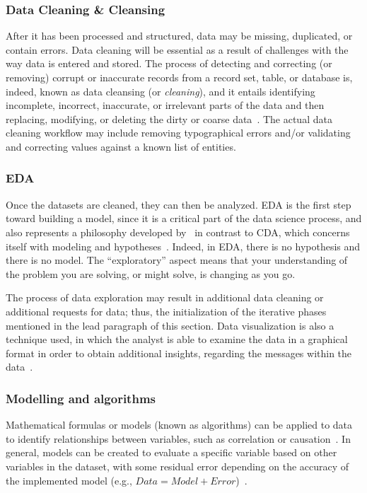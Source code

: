 \subsubsection{Data Cleaning \& Cleansing}
After it has been processed and structured, data may be missing, duplicated, or contain errors. Data cleaning will be essential as a result of challenges with the way data is entered and stored.
The process of detecting and correcting (or removing) corrupt or inaccurate records from a record set, table, or database is, indeed, known as data cleansing (or \textit{cleaning}),
and it entails identifying incomplete, incorrect, inaccurate, or irrelevant parts of the data and then replacing, modifying, or deleting the dirty or coarse data~\cite{Misc:2019_data_cleaning_wiki}.
The actual data cleaning workflow may include removing typographical errors and/or validating and correcting values against a known list of entities.

\subsubsection{\acl{EDA}}
Once the datasets are cleaned, they can then be analyzed.
\ac{EDA} is the first step toward building a model, since it is a critical part of the data science process, and also represents a philosophy developed by~\citeauthor{Article:future_of_data_tukey}
in contrast to \ac{CDA}, which concerns itself with modeling and hypotheses~\cite{Article:future_of_data_tukey}.
Indeed, in \ac{EDA}, there is no hypothesis and there is no model. The ``exploratory'' aspect means that your understanding of the problem you are solving, or might solve, is changing as you go.

The process of data exploration may result in additional data cleaning or additional requests for data; thus, the initialization of the iterative phases mentioned in the lead paragraph of this section.
Data visualization is also a technique used, in which the analyst is able to examine the data in a graphical format in order to obtain additional insights, regarding the messages within the data~\cite{Book:doing_data_science}.

\subsubsection{Modelling and algorithms}
Mathematical formulas or models (known as algorithms) can be applied to data to identify relationships between variables, such as correlation or causation~\cite{Book:pruneau_2017}.
In general, models can be created to evaluate a specific variable based on other variables in the dataset, with some residual error depending on the accuracy of the implemented model (e.g., $Data = Model + Error$)~\cite{Book:judd_1989_data_model}.

